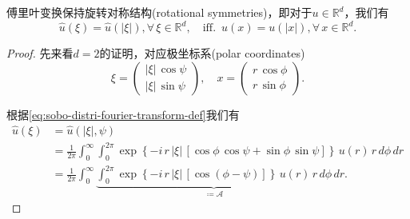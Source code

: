 \begin{lemma}[傅里叶变换的旋转对称]
  \label{lemma:fourier-transform-rotating-symmetries}
  傅里叶变换保持旋转对称结构(rotational symmetries)，即对于$u \in \mathbb{R}^d$，我们有
  \begin{equation*}
    \widehat{u}(\xi) = \widehat{u}(\left| \xi \right|), \forall \, \xi \in \mathbb{R}^{d}, \quad \text{iff. } \, u(x) = u(\left| x \right|), \forall \, x \in \mathbb{R}^d.
  \end{equation*}
\end{lemma}
\begin{proof}
  先来看$d=2$的证明，对应极坐标系(polar coordinates)
  \begin{equation*}
    \xi = \begin{pmatrix}
    \left| \xi \right| \, \cos \psi \\
    \left| \xi \right| \, \sin \psi
    \end{pmatrix},
    \quad
    x = \begin{pmatrix}
    r \, \cos \phi \\
    r \, \sin \phi
    \end{pmatrix}.
  \end{equation*}

根据\eqref{eq:sobo-distri-fourier-transform-def}我们有
\begin{equation}
  \label{eq:sobo-fourier-transform-symmetry-2d-0}
\begin{split}
  \widehat{u} \left( \xi \right) &= \widehat{u}\left( \left| \xi \right|, \psi \right) \\
  &=\frac{1}{2\pi} \int_{0}^{\infty} \int_{0}^{2 \pi}
  \exp \left\{
  - i \, r \, \left| \xi \right| \,
  \left[
  \cos \phi \, \cos \psi + \sin \phi \, \sin \psi
  \right]
  \right\} \,
  u(r) \, r \, d \phi \, d r \\
  &=\frac{1}{2\pi} \int_{0}^{\infty} \underbrace{\int_{0}^{2 \pi}
  \exp \left\{
  - i \, r \, \left| \xi \right| \,
  \left[
  \cos \left( \phi - \psi \right)
  \right]
  \right\} \,
  u(r) \, r \, d \phi}_{\coloneqq \mathcal{A}} \, d r.
\end{split}
\end{equation}


\end{proof}
